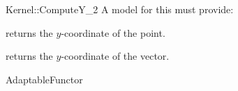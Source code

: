 \begin{ccRefFunctionObjectConcept}{Kernel::ComputeY_2}
A model for this must provide:


       {returns the $y$-coordinate of the point.}

       {returns the $y$-coordinate of the vector.}

\ccRefines
AdaptableFunctor



\end{ccRefFunctionObjectConcept}
